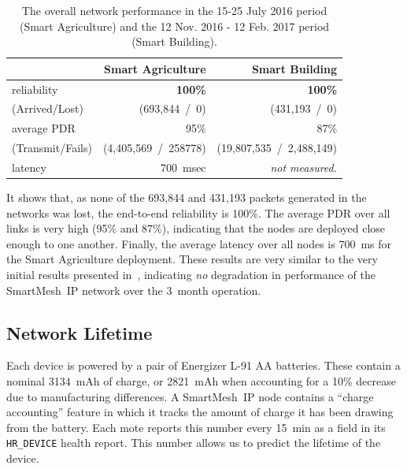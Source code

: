 \documentclass{elsarticle}
\newcommand{\smip}                {SmartMesh~IP\xspace}
\newcommand{\building}            {Smart Building\xspace}
\newcommand{\agri}                {Smart Agriculture\xspace}
\newcommand{\HRDEVICE}            {{\tt HR\_DEVICE}\xspace}
\newcommand{\PEACHNUMPCKTS}       {693,844\xspace}
\newcommand{\EVANUMPCKTS}         {431,193\xspace}
\begin{document}
\begin{table}
    \centering
    \begin{tabular}{|l|r|r|}
        \toprule
        {}                              & \agri                     & \building                    \\
        \midrule
        reliability                     & \textbf{100\%}            & \textbf{100\%}               \\
        (Arrived/Lost)                  & (\PEACHNUMPCKTS~/~0)      & (\EVANUMPCKTS~/~0)           \\
        \hline
        average PDR                     & 95\%                      &  87\%                        \\
        (Transmit/Fails)                & (4,405,569~/~258778)      &  (19,807,535~/~2,488,149)    \\
        \hline
        latency                         & 700~msec                  &  \textit{not measured.}      \\
        \bottomrule
    \end{tabular}
    \caption{The overall network performance in the 15-25 July 2016 period (\agri) and the 12 Nov. 2016 - 12 Feb. 2017 period (\building).}
    \label{tab:net_stats}
\end{table}

It shows that, as none of the \PEACHNUMPCKTS and \EVANUMPCKTS packets generated in the networks was lost, the end-to-end reliability is 100\%.
The average PDR over all links is very high (95\% and 87\%), indicating that the nodes are deployed close enough to one another.
Finally, the average latency over all nodes is 700~ms for the \agri deployment.
These results are very similar to the very initial results presented in~\cite{watteyne16peach}, indicating \textit{no} degradation in performance of the \smip network over the 3~month operation.

\subsection{Network Lifetime}
\label{sec:lifetime}


Each device is powered by a pair of Energizer L-91 AA batteries.
These contain a nominal 3134~mAh of charge, or 2821~mAh when accounting for a 10\% decrease due to manufacturing differences.
A \smip node contains a ``charge accounting'' feature in which it tracks the amount of charge it has been drawing from the battery.
Each mote reports this number every 15~min as a field in its \HRDEVICE health report.
This number allows us to predict the lifetime of the device.
\end{document}
